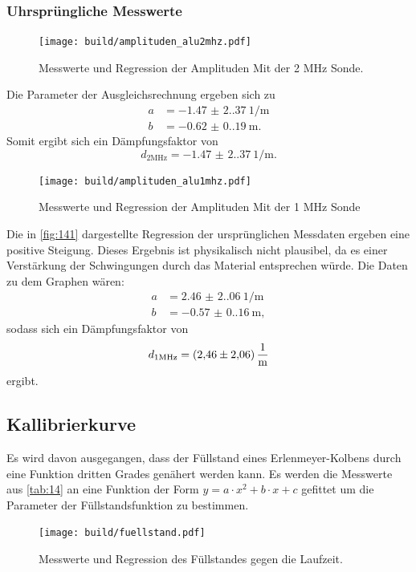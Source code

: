 \subsubsection{Uhrsprüngliche Messwerte}
\begin{figure}[H]
    \centering
    \caption{Messwerte und Regression der Amplituden Mit der 2 $\unit{\mega\hertz}$ Sonde.}
    \label{fig:131}
    \texttt{[image: build/amplituden\_alu2mhz.pdf]}
\end{figure}
\noindent Die Parameter der Ausgleichsrechnung ergeben sich zu 
\begin{align*}
    a &= \qty{-1.47(2.37)}{1 \per\meter}\\
    b &= \qty{-0.62(0.19)}{\meter}.
\end{align*}
Somit ergibt sich ein Dämpfungsfaktor von 
\begin{equation}
    d_{2 \unit{\mega\hertz}} = \qty{-1.47(2.37)}{1 \per\meter}.
\end{equation}

\begin{figure}[H]
    \centering
    \caption{Messwerte und Regression der Amplituden Mit der 1 $\unit{\mega\hertz}$ Sonde }
    \label{fig:141}
    \texttt{[image: build/amplituden\_alu1mhz.pdf]}
\end{figure}
\noindent Die in \autoref{fig:141} dargestellte Regression
der ursprünglichen Messdaten ergeben eine positive Steigung. Dieses Ergebnis
ist physikalisch nicht plausibel, da es einer Verstärkung der Schwingungen
durch das Material entsprechen würde.
Die Daten zu dem Graphen wären:
\begin{align*}
    a &= \qty{2.46(2.06)}{1 \per\meter}\\
    b &= \qty{-0.57(0.16)}{\meter},
\end{align*}
sodass sich ein Dämpfungsfaktor von 
\begin{equation}
    d_{1 \unit{\mega\hertz}} = \qty{2.46 \pm 2.06}{\per\meter}
\end{equation}
ergibt.

\subsection{Kallibrierkurve}
Es wird davon ausgegangen, dass der Füllstand eines Erlenmeyer-Kolbens durch
eine Funktion dritten Grades genähert werden kann. Es werden die Messwerte 
aus \autoref{tab:14} an eine Funktion der Form $y = a \cdot x^2 + b \cdot x + c $ gefittet 
um die Parameter der Füllstandsfunktion zu bestimmen. 
\begin{figure}[H]
    \centering
    \caption{Messwerte und Regression des Füllstandes gegen die Laufzeit.}
    \label{fig:15}
    \texttt{[image: build/fuellstand.pdf]}
\end{figure}

